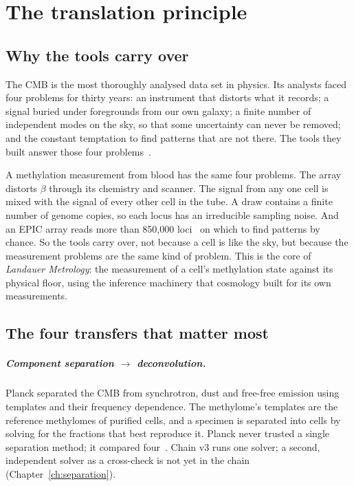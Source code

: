 \chapter{The translation principle}\label{ch:translation}

\section{Why the tools carry over}

The CMB is the most thoroughly analysed data set in physics. Its analysts faced four problems for thirty years: an
instrument that distorts what it records; a signal buried under foregrounds from our own galaxy; a finite number of
independent modes on the sky, so that some uncertainty can never be removed; and the constant temptation to find
patterns that are not there. The tools they built answer those four problems~\cite{Planck2018I,Planck2018IV}.

A methylation measurement from blood has the same four problems. The array distorts $\beta$ through its chemistry and
scanner. The signal from any one cell is mixed with the signal of every other cell in the tube. A draw contains a finite
number of genome copies, so each locus has an irreducible sampling noise. And an EPIC array reads more than 850,000 loci~\cite{Fortin2017} on which
to find patterns by chance. So the tools carry over, not because a cell is like the sky, but because the measurement
problems are the same kind of problem. This is the core of \emph{Landauer Metrology}: the measurement of a cell's
methylation state against its physical floor, using the inference machinery that cosmology built for its own
measurements.

\section{The four transfers that matter most}

\paragraph{Component separation $\to$ deconvolution.} Planck separated the CMB from synchrotron, dust and free-free emission
using templates and their frequency dependence. The methylome's templates are the reference methylomes of purified cells,
and a specimen is separated into cells by solving for the fractions that best reproduce it. Planck never trusted a single
separation method; it compared four~\cite{Planck2018IV}. Chain v3 runs one solver; a second, independent solver as a cross-check is
not yet in the chain (Chapter~\ref{ch:separation}). \openprob

